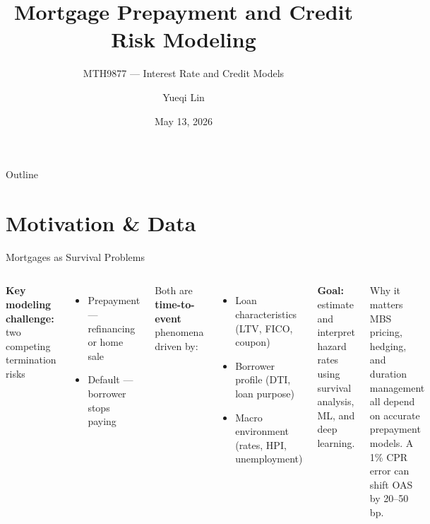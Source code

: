 \documentclass[aspectratio=169]{beamer}
\title[Mortgage Prepayment \& Credit Risk]{%
  Mortgage Prepayment and Credit Risk Modeling}
\subtitle{MTH9877 — Interest Rate and Credit Models}
\author{Yueqi Lin}
\institute{Baruch College, CUNY}
\date{May 13, 2026}
\begin{document}
\begin{frame}
  \titlepage
\end{frame}

\begin{frame}{Outline}
  \tableofcontents[hideallsubsections]
\end{frame}

\section{Motivation \& Data}

\begin{frame}{Mortgages as Survival Problems}
  \begin{columns}
      \textbf{Key modeling challenge:} two competing termination risks
      \begin{itemize}
        \item \alert{Prepayment} — refinancing or home sale
        \item \alert{Default} — borrower stops paying
      \end{itemize}
      \vspace{0.4em}
      Both are \textbf{time-to-event} phenomena driven by:
      \begin{itemize}
        \item Loan characteristics (LTV, FICO, coupon)
        \item Borrower profile (DTI, loan purpose)
        \item Macro environment (rates, HPI, unemployment)
      \end{itemize}
      \vspace{0.4em}
      \textbf{Goal:} estimate and interpret hazard rates using survival
      analysis, ML, and deep learning.
      \begin{block}{Why it matters}
        MBS pricing, hedging, and duration management all depend on
        accurate prepayment models.
        A 1\% CPR error can shift OAS by 20–50 bp.
      \end{block}
  \end{columns}
\end{frame}
\end{document}
